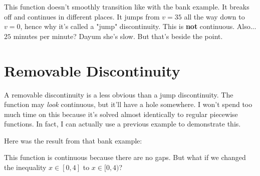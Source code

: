 This function doesn't smoothly transition like with the bank example. It breaks off and continues in different places. It jumps from $v = 35$ all the way down to $v = 0$, hence why it's called a "jump" discontinuity. This is \textbf{not} continuous. Also... $25$ minutes per minute? Dayum she's slow. But that's beside the point.
\clearpage
\section{Removable Discontinuity}
A removable discontinuity is a less obvious than a jump discontinuity. The function may \textit{look} continuous, but it'll have a hole somewhere. I won't spend too much time on this because it's solved almost identically to regular piecewise functions. In fact, I can actually use a previous example to demonstrate this.

Here was the result from that bank example:
\begin{center}
    \raisebox{0.5cm}{%
        \begin{minipage}[c]{0.48\textwidth}
            \centering
            \[
            g(x) = 
            \begin{cases}
                10x & x \in [0, 4] \\
                7(x - 4) + 40 & x \in (4, 13] \\
                5(x - 13) + 103 & x \in (13, \infty)
            \end{cases}
            \]
        \end{minipage}%
    }
    \begin{minipage}[c]{0.48\textwidth}
        \centering
    \end{minipage}
\end{center}
This function is continuous because there are no gaps. But what if we changed the inequality $x \in [0, 4]$ to $x \in [0, 4)$?

